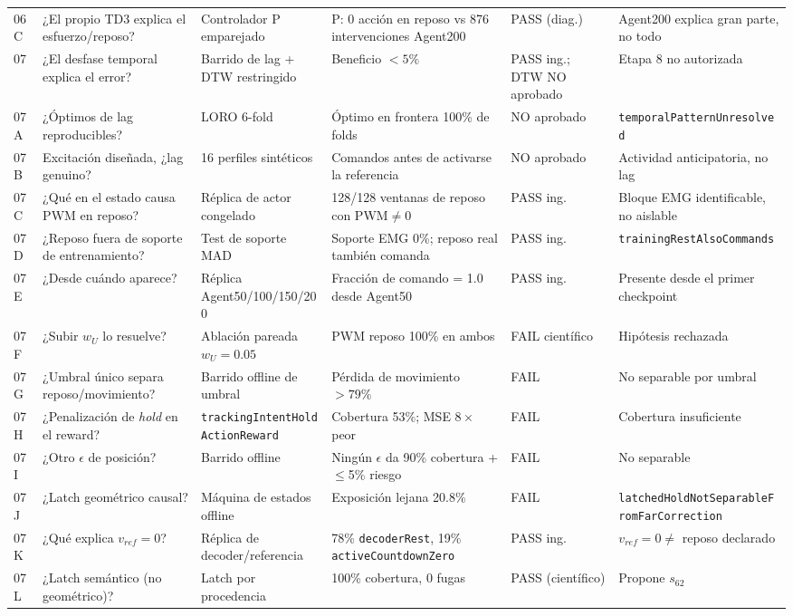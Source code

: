 \documentclass[11pt,a4paper]{article}
\begin{document}
\begin{longtable}{p{1.3cm}p{3.1cm}p{3.3cm}p{3.6cm}p{1.6cm}p{3.4cm}}
06C & ¿El propio TD3 explica el esfuerzo/reposo? & Controlador P emparejado & P: 0 acción en reposo vs 876 intervenciones Agent200 & PASS (diag.) & Agent200 explica gran parte, no todo \\
07 & ¿El desfase temporal explica el error? & Barrido de lag + DTW restringido & Beneficio $<5\%$ & PASS ing.; DTW NO aprobado & Etapa 8 no autorizada \\
07A & ¿Óptimos de lag reproducibles? & LORO 6-fold & Óptimo en frontera 100\% de folds & NO aprobado & \texttt{temporalPatternUnresolved} \\
07B & Excitación diseñada, ¿lag genuino? & 16 perfiles sintéticos & Comandos antes de activarse la referencia & NO aprobado & Actividad anticipatoria, no lag \\
07C & ¿Qué en el estado causa PWM en reposo? & Réplica de actor congelado & 128/128 ventanas de reposo con PWM$\neq$0 & PASS ing. & Bloque EMG identificable, no aislable \\
07D & ¿Reposo fuera de soporte de entrenamiento? & Test de soporte MAD & Soporte EMG 0\%; reposo real también comanda & PASS ing. & \texttt{trainingRestAlsoCommands} \\
07E & ¿Desde cuándo aparece? & Réplica Agent50/100/150/200 & Fracción de comando = 1.0 desde Agent50 & PASS ing. & Presente desde el primer checkpoint \\
07F & ¿Subir $w_U$ lo resuelve? & Ablación pareada $w_U{=}0.05$ & PWM reposo 100\% en ambos & FAIL científico & Hipótesis rechazada \\
07G & ¿Umbral único separa reposo/movimiento? & Barrido offline de umbral & Pérdida de movimiento $>79\%$ & FAIL & No separable por umbral \\
07H & ¿Penalización de \emph{hold} en el reward? & \texttt{trackingIntentHoldActionReward} & Cobertura 53\%; MSE $8\times$ peor & FAIL & Cobertura insuficiente \\
07I & ¿Otro $\epsilon$ de posición? & Barrido offline & Ningún $\epsilon$ da 90\% cobertura + $\leq$5\% riesgo & FAIL & No separable \\
07J & ¿Latch geométrico causal? & Máquina de estados offline & Exposición lejana 20.8\% & FAIL & \texttt{latchedHoldNotSeparableFromFarCorrection} \\
07K & ¿Qué explica $v_{ref}=0$? & Réplica de decoder/referencia & 78\% \texttt{decoderRest}, 19\% \texttt{activeCountdownZero} & PASS ing. & $v_{ref}=0 \neq$ reposo declarado \\
07L & ¿Latch semántico (no geométrico)? & Latch por procedencia & 100\% cobertura, 0 fugas & PASS (científico) & Propone $s_{62}$ \\

\end{longtable}
\end{document}
